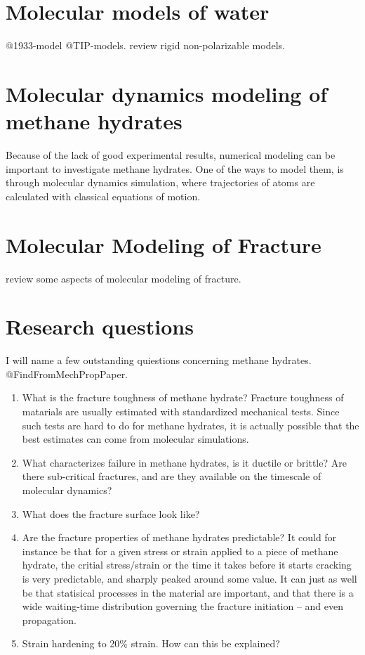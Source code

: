 \section{Molecular models of water}
@1933-model @TIP-models.  \citet{Vega2011} review rigid non-polarizable models.


\section{Molecular dynamics modeling of methane hydrates}
Because of the lack of good experimental results, numerical modeling can be important to investigate methane hydrates. One of the ways to model them, is through molecular dynamics simulation, where trajectories of atoms are calculated with classical equations of motion.

\section{Molecular Modeling of Fracture}
\citet{doi:10.1142/9789812773326_0001} review some aspects of molecular modeling of fracture. 


\section{Research questions}
I will name a few outstanding quiestions concerning methane hydrates. @FindFromMechPropPaper.

\begin{enumerate}
\item What is the fracture toughness of methane hydrate? Fracture toughness of matarials are usually estimated with standardized mechanical tests. Since such tests are hard to do for methane hydrates, it is actually possible that the best estimates can come from molecular simulations. 
\item What characterizes failure in methane hydrates, is it ductile or brittle? Are there sub-critical fractures, and are they available on the timescale of molecular dynamics?
\item What does the fracture surface look like?
\item Are the fracture properties of methane hydrates predictable? It could for instance be that for a given stress or strain applied to a piece of methane hydrate, the critial stress/strain or the time it takes before it starts cracking is very predictable, and sharply peaked around some value. It can just as well be that statisical processes in the material are important, and that there is a wide waiting-time distribution governing the fracture initiation -- and even propagation.
\item Strain hardening to 20\% strain. How can this be explained?
\end{enumerate}

